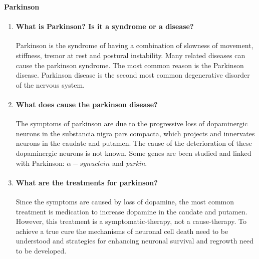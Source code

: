 \documentclass[12pt,article,oneside,a4paper]{memoir}
\begin{document}
\textbf{Parkinson}\\
\begin{enumerate}
\item \paragraph{What is Parkinson? Is it a syndrome or a disease?}
Parkinson is the syndrome of having a combination of slowness of movement,
stiffness, tremor at rest and postural instability. Many related diseases can
cause the parkinson syndrome. The most common reason is the Parkinson disease.
Parkinson disease is the second most common degenerative disorder of the
nervous system.

\item \paragraph{What does cause the parkinson disease?}
The symptoms of parkinson are due to the progressive loss of dopaminergic
neurons in the substancia nigra pars compacta, which projects and innervates
neurons in the caudate and putamen. The cause of the deterioration of these
dopaminergic neurons is not known. Some genes are been studied and linked with
Parkinson: $\alpha-synuclein$ and \textit{parkin}.

\item \paragraph{What are the treatments for parkinson?}
Since the symptoms are caused by loss of dopamine, the most common treatment is
medication to increase dopamine in the caudate and putamen. However, this
treatment is a symptomatic-therapy, not a cause-therapy.
To achieve a true cure the mechanisms of neuronal cell death need to be
understood and strategies for enhancing neuronal survival and regrowth need to
be developed.

\end{enumerate}
\end{document}
